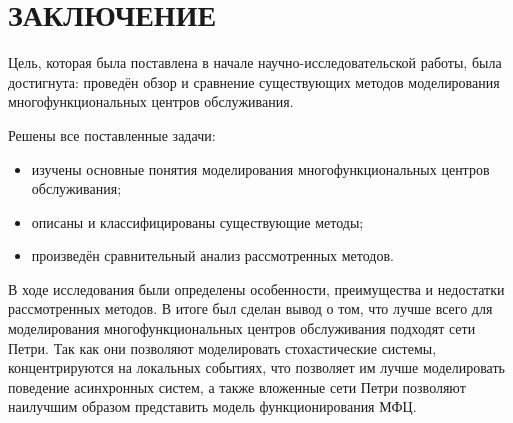 \chapter*{ЗАКЛЮЧЕНИЕ}

Цель, которая была поставлена в начале научно-исследовательской работы, была достигнута: проведён обзор и сравнение существующих методов моделирования многофункциональных центров обслуживания.

Решены все поставленные задачи:
\begin{itemize}[label=---]
	\item изучены основные понятия моделирования многофункциональных центров обслуживания;
	\item описаны и классифицированы существующие методы;
	\item произведён сравнительный анализ рассмотренных методов.
\end{itemize}

В ходе исследования были определены особенности, преимущества и недостатки рассмотренных методов. В итоге был сделан вывод о том, что лучше всего для моделирования многофункциональных центров обслуживания подходят сети Петри. Так как они позволяют моделировать стохастические системы, концентрируются на локальных событиях, что позволяет им лучше моделировать поведение асинхронных систем, а также вложенные сети Петри позволяют наилучшим образом представить модель функционирования МФЦ.